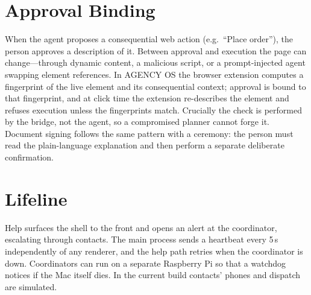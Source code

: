 \documentclass[11pt]{article}
\begin{document}
\section{Approval Binding}\label{sec:bind}
When the agent proposes a consequential web action (e.g.\ ``Place order''), the person approves a description of it. Between approval and execution the page can change---through dynamic content, a malicious script, or a prompt-injected agent swapping element references. In \textsc{AGENCY OS} the browser extension computes a fingerprint of the live element and its consequential context; approval is bound to that fingerprint, and at click time the extension re-describes the element and refuses execution unless the fingerprints match. Crucially the check is performed by the bridge, not the agent, so a compromised planner cannot forge it. Document signing follows the same pattern with a ceremony: the person must read the plain-language explanation and then perform a separate deliberate confirmation.

\section{Lifeline}
Help surfaces the shell to the front and opens an alert at the coordinator, escalating through contacts. The main process sends a heartbeat every 5\,s independently of any renderer, and the help path retries when the coordinator is down. Coordinators can run on a separate Raspberry Pi so that a watchdog notices if the Mac itself dies. In the current build contacts' phones and dispatch are simulated.
\end{document}
